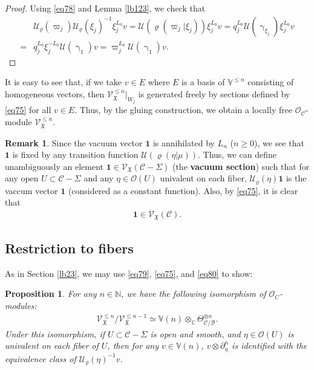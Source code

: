 \documentclass[12pt,a4paper,notitlepage]{report}
\theoremstyle{definition}
\newtheorem{rem}[df]{Remark}
\theoremstyle{plain}
\newtheorem{pp}[df]{Proposition}
\newcommand{\fk}{\mathfrak}
\newcommand{\mc}{\mathcal}
\newcommand{\id}{\mathbf{1}}
\newcommand{\scr}{\mathscr}
\newcommand{\Vbb}{\mathbb V}
\newcommand{\Cbb}{\mathbb C}
\newcommand{\Nbb}{\mathbb N}
\numberwithin{equation}{section}
\begin{document}
\begin{proof}
Using   \eqref{eq78} and Lemma \ref{lb123}, we check that
\begin{align*}
&\mc U_\varrho(\varpi_j)\mc U_\varrho(\xi_j)^{-1}\xi_j^{L_0}v=\mc U(\varrho(\varpi_j|\xi_j))\xi_j^{L_0}v=q_j^{L_0}\mc U(\upgamma_{\xi_j})\xi_j^{L_0}v\\
=&q_j^{L_0}\xi_j^{-L_0}\mc U(\upgamma_1)v=\varpi_j^{L_0}\mc U(\upgamma_1)v.
\end{align*}
\end{proof}

It is easy to see that, if we take $v\in E$ where $E$ is a basis of $\Vbb^{\leq n}$ consisting of homogeneous vectors, then $\scr V_{\fk X}^{\leq n}|_{W_j}$ is generated freely by sections defined by \eqref{eq75} for all $v\in E$. Thus, by the gluing construction, we obtain a locally free $\scr O_{\mc C}$-module $\scr V_{\fk X}^{\leq n}$.



\begin{rem}\label{lb46}
Since the vacuum vector $\id$ is annihilated by $L_n$ ($n\geq 0$), we see that $\id$ is fixed by any transition function $\mc U(\varrho(\eta|\mu))$. Thus, we can define unambiguously an element $\id\in\scr V_{\fk X}(\mc C-\Sigma)$ (the \textbf{vacuum section}) such that for any open $U\subset\mc C-\Sigma$ and any $\eta\in\scr O(U)$ univalent on each fiber, $\mc U_\varrho(\eta)\id$ is the vaccum vector $\id$ (considered as a constant function). \index{1@$\id$} Also, by \eqref{eq75}, it is clear that
\begin{align*}
\id\in\scr V_{\fk X}(\mc C).
\end{align*}
\end{rem}




\subsection*{Restriction to fibers}



As in Section \ref{lb23}, we may use \eqref{eq79}, \eqref{eq75}, and \eqref{eq80} to show:

\begin{pp}\label{lb56}
For any $n\in\Nbb$, we have the following isomorphism of  $\scr O_C$-modules:
\begin{align}
\scr V_{\fk X}^{\leq n}/\scr V_{\fk X}^{\leq n-1}\simeq\Vbb(n)\otimes_{\Cbb}\Theta_{\mc C/\mc B}^{\otimes n}.\label{eq153}
\end{align}
Under this isomorphism, if $U\subset \mc C-\Sigma$ is open and smooth, and $\eta\in\scr O(U)$ is univalent on each fiber of $U$, then for any $v\in\Vbb(n)$, $v\otimes \partial_\eta^n$ is identified with the equivalence class of $\mc U_\varrho(\eta)^{-1}v$.
\end{pp}
\end{document}
